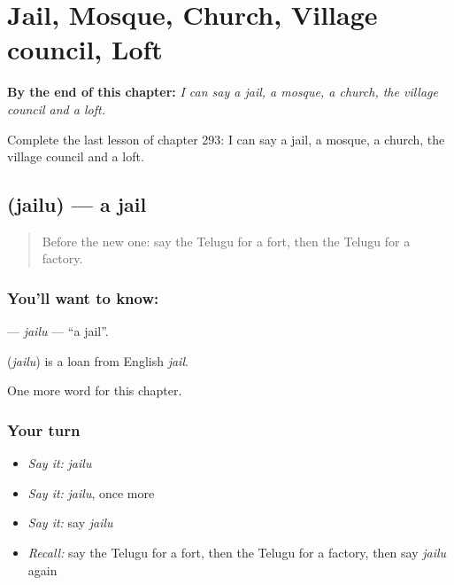 
\chapter{Jail, Mosque, Church, Village council, Loft}
\label{ch:te-jail-mosque-church-village-council-loft}

\begin{chapteropening}
\textbf{By the end of this chapter:} \emph{I can say a jail, a mosque, a church, the village council and a loft.}

Complete the last lesson of chapter 293: I can say a jail, a mosque, a church, the village council and a loft.
\end{chapteropening}

\section[\texorpdfstring{\te{జైలు} (jailu)}{జైలు (jailu)}]{ (jailu) — a jail}

\label{lesson:TE-C293-jailu}



\begin{quote}
Before the new one: say the Telugu for a fort, then the Telugu for a factory.
\end{quote}

\subsection*{You'll want to know: }
\textbf{} — \emph{jailu} — \textquotedblleft{}a jail\textquotedblright{}.

\begin{cousinweb}
\textbf{} (\emph{jailu}) is a loan from English \emph{jail}.
\end{cousinweb}

\begin{grammarlens}[title={What you've built}]
One more word for this chapter.
\end{grammarlens}

\subsection*{Your turn}
\begin{itemize}
\raggedright
  \item \emph{Say it:} \emph{jailu}
  \item \emph{Say it:} \emph{jailu}, once more
  \item \emph{Say it:} say \emph{jailu}
  \item \emph{Recall:} say the Telugu for a fort, then the Telugu for a factory, then say \emph{jailu} again
\end{itemize}

